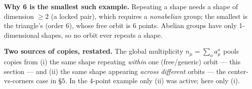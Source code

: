 \documentclass[11pt]{article}
\begin{document}
\textbf{Why 6 is the smallest such example.} Repeating a shape needs a shape of dimension $\ge2$ (a
locked pair), which requires a \emph{nonabelian} group; the smallest is the triangle's (order 6), whose
free orbit is 6 points. Abelian groups have only 1-dimensional shapes, so no orbit ever repeats a shape.

\textbf{Two sources of copies, restated.} The global multiplicity $n_\mu=\sum_o a^o_\mu$ pools copies
from (i) the same shape repeating \emph{within} one (free/generic) orbit --- this section --- and (ii) the
same shape appearing \emph{across different} orbits --- the center-vs-corners case in \S5. In the
4-point example only (ii) was active; here only (i).
\end{document}
